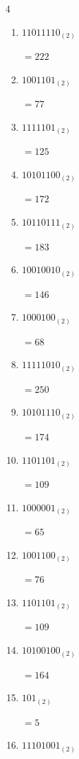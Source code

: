 \begin{multicols}{4}
\begin{enumerate}
        $=4$

  \item $11011110_{(2)}$

        $=222$

  \item $1001101_{(2)}$

        $=77$

  \item $1111101_{(2)}$

        $=125$

  \item $10101100_{(2)}$

        $=172$

  \item $10110111_{(2)}$

        $=183$

\columnbreak %

\resetques

  \item $10010010_{(2)}$

        $=146$

  \item $1000100_{(2)}$

        $=68$

  \item $11111010_{(2)}$

        $=250$

  \item $10101110_{(2)}$

        $=174$

  \item $1101101_{(2)}$

        $=109$

  \item $1000001_{(2)}$

        $=65$

  \item $1001100_{(2)}$

        $=76$

  \item $1101101_{(2)}$

        $=109$

  \item $10100100_{(2)}$

        $=164$

  \item $101_{(2)}$

        $=5$

  \item $11101001_{(2)}$


\end{enumerate}
\end{multicols}
